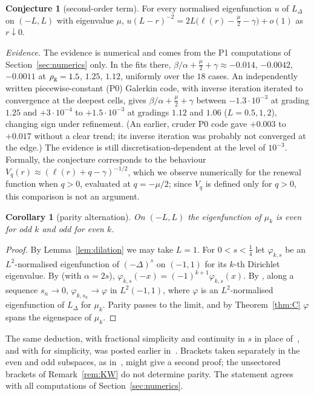 \documentclass[11pt]{amsart}
\newcommand{\LD}{L_\Delta}
\newcommand{\e}[1]{\cdot 10^{#1}}
\newtheorem{corollary}[theorem]{Corollary}
\theoremstyle{definition}
\newtheorem{conjecture}[theorem]{Conjecture}
\theoremstyle{remark}
\numberwithin{equation}{section}
\begin{document}
\begin{conjecture}[second-order term]\label{conj:second}
For every normalised eigenfunction $u$ of $\LD$ on $(-L,L)$ with eigenvalue $\mu$, $u(L-r)^{-2}=2L\bigl(\ell(r)-\frac\mu2-\gamma\bigr)+o(1)$ as $r\downarrow0$.
\end{conjecture}
\noindent\emph{Evidence.} The evidence is numerical and comes from the P1 computations of Section~\ref{sec:numerics} only. In the fits there, $\beta/\alpha+\frac\mu2+\gamma\approx-0.014$, $-0.0042$, $-0.0011$ at $\rho_{\rm g}=1.5$, $1.25$, $1.12$, uniformly over the $18$ cases. An independently written piecewise-constant (P0) Galerkin code, with inverse iteration iterated to convergence at the deepest cells, gives $\beta/\alpha+\frac\mu2+\gamma$ between $-1.3\e{-3}$ at grading $1.25$ and $+3\e{-4}$ to $+1.5\e{-3}$ at gradings $1.12$ and $1.06$ ($L=0.5,1,2$), changing sign under refinement. (An earlier, cruder P0 code gave $+0.003$ to $+0.017$ without a clear trend; its inverse iteration was probably not converged at the edge.) The evidence is still discretisation-dependent at the level of $10^{-3}$. Formally, the conjecture corresponds to the behaviour $V_q(r)\approx(\ell(r)+q-\gamma)^{-1/2}$, which we observe numerically for the renewal function when $q>0$, evaluated at $q=-\mu/2$; since $V_q$ is defined only for $q>0$, this comparison is not an argument.

\begin{corollary}[parity alternation]\label{cor:parity}
On $(-L,L)$ the eigenfunction of $\mu_k$ is even for odd $k$ and odd for even $k$.
\end{corollary}
\begin{proof}
By Lemma~\ref{lem:dilation} we may take $L=1$. For $0<s<\frac14$ let $\varphi_{k,s}$ be an $L^2$-normalised eigenfunction of $(-\Delta)^s$ on $(-1,1)$ for its $k$-th Dirichlet eigenvalue. By \cite[Lemma~6.1]{Zh26} (with $\alpha=2s$), $\varphi_{k,s}(-x)=(-1)^{k+1}\varphi_{k,s}(x)$. By \cite[Thm.~1.1(v)]{FJW22}, along a sequence $s_n\to0$, $\varphi_{k,s_n}\to\varphi$ in $L^2(-1,1)$, where $\varphi$ is an $L^2$-normalised eigenfunction of $\LD$ for $\mu_k$. Parity passes to the limit, and by Theorem~\ref{thm:C} $\varphi$ spans the eigenspace of $\mu_k$.
\end{proof}
\noindent The same deduction, with fractional simplicity \cite[Cor.~2]{FGMP23} and continuity in $s$ in place of~\cite{Zh26}, and with \cite[Cor.~2.3]{BT26} for simplicity, was posted earlier in~\cite{BT26c}. Brackets taken separately in the even and odd subspaces, as in~\cite{Zh26,Ch26}, might give a second proof; the unsectored brackets of Remark~\ref{rem:KW} do not determine parity. The statement agrees with all computations of Section~\ref{sec:numerics}.
\end{document}
